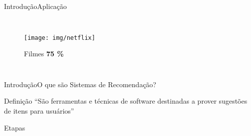 \begin{frame}{Introdução}{Aplicação}
\begin{columns}[b]
\begin{figure}[ht]
    \begin{center}
    \texttt{[image: img/netflix]}

    Filmes \textbf{75 \%} \\
    \cite{netflix75}
    \end{center}
\end{figure}
\end{columns}
\end{frame}




\begin{frame}{Introdução}{O que são Sistemas de Recomendação?}
\begin{block}{Definição}
``São ferramentas e técnicas de software destinadas a prover sugestões de itens para usuários'' \cite{ricci2011introduction-chap1}
\end{block}

\begin{block}{Etapas}

\end{block}
\end{frame}